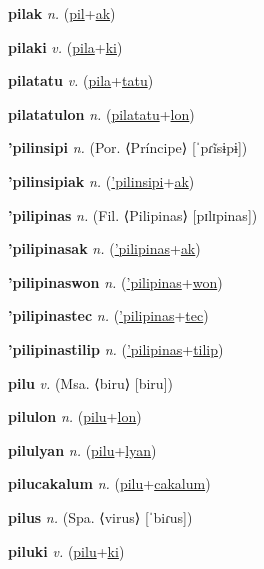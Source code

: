 \textbf{\hypertarget{pilak}{pilak}} \textit{n.} (\hyperlink{pil}{pil}+\allowbreak \hyperlink{ak}{ak})


\textbf{\hypertarget{pilaki}{pilaki}} \textit{v.} (\hyperlink{pila}{pila}+\allowbreak \hyperlink{ki}{ki})


\textbf{\hypertarget{pilatatu}{pilatatu}} \textit{v.} (\hyperlink{pila}{pila}+\allowbreak \hyperlink{tatu}{tatu})


\textbf{\hypertarget{pilatatulon}{pilatatulon}} \textit{n.} (\hyperlink{pilatatu}{pilatatu}+\allowbreak \hyperlink{lon}{lon})


\textbf{\hypertarget{'pilinsipi}{'pilinsipi}} \textit{n.} (Por. ⟨Príncipe⟩ [ˈpɾĩsɨpɨ])


\textbf{\hypertarget{'pilinsipiak}{'pilinsipiak}} \textit{n.} (\hyperlink{'pilinsipi}{'pilinsipi}+\allowbreak \hyperlink{ak}{ak})


\textbf{\hypertarget{'pilipinas}{'pilipinas}} \textit{n.} (Fil. ⟨Pilipinas⟩ [pɪlɪpinas])


\textbf{\hypertarget{'pilipinasak}{'pilipinasak}} \textit{n.} (\hyperlink{'pilipinas}{'pilipinas}+\allowbreak \hyperlink{ak}{ak})


\textbf{\hypertarget{'pilipinaswon}{'pilipinaswon}} \textit{n.} (\hyperlink{'pilipinas}{'pilipinas}+\allowbreak \hyperlink{won}{won})


\textbf{\hypertarget{'pilipinastec}{'pilipinastec}} \textit{n.} (\hyperlink{'pilipinas}{'pilipinas}+\allowbreak \hyperlink{tec}{tec})


\textbf{\hypertarget{'pilipinastilip}{'pilipinastilip}} \textit{n.} (\hyperlink{'pilipinas}{'pilipinas}+\allowbreak \hyperlink{tilip}{tilip})


\textbf{\hypertarget{pilu}{pilu}} \textit{v.} (Msa. ⟨biru⟩ [biru])


\textbf{\hypertarget{pilulon}{pilulon}} \textit{n.} (\hyperlink{pilu}{pilu}+\allowbreak \hyperlink{lon}{lon})


\textbf{\hypertarget{pilulyan}{pilulyan}} \textit{n.} (\hyperlink{pilu}{pilu}+\allowbreak \hyperlink{lyan}{lyan})


\textbf{\hypertarget{pilucakalum}{pilucakalum}} \textit{n.} (\hyperlink{pilu}{pilu}+\allowbreak \hyperlink{cakalum}{cakalum})


\textbf{\hypertarget{pilus}{pilus}} \textit{n.} (Spa. ⟨virus⟩ [ˈbiɾus])


\textbf{\hypertarget{piluki}{piluki}} \textit{v.} (\hyperlink{pilu}{pilu}+\allowbreak \hyperlink{ki}{ki})


